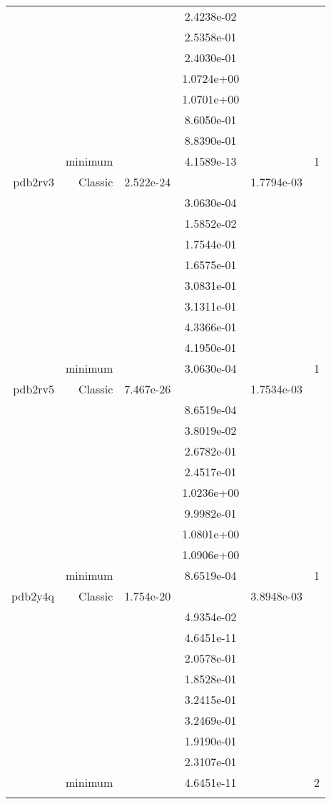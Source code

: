 \begin{xltabular}{\textwidth}{r|rS[table-format=1.3e+2]S[table-format=1.4e+2]S[table-format=1.4e+2]S[table-format=-1.5]}
&  &  & 2.4238e-02 & & \\
&  &  & 2.5358e-01 & & \\
&  &  & 2.4030e-01 & & \\
&  &  & 1.0724e+00 & & \\
&  &  & 1.0701e+00 & & \\
&  &  & 8.6050e-01 & & \\
&  &  & 8.8390e-01 & & \\
& minimum &  & 4.1589e-13 & & 1 \\  \addlinespace
pdb2rv3 & Classic & 2.522e-24 &  & 1.7794e-03 & \\
&  &  & 3.0630e-04 & & \\
&  &  & 1.5852e-02 & & \\
&  &  & 1.7544e-01 & & \\
&  &  & 1.6575e-01 & & \\
&  &  & 3.0831e-01 & & \\
&  &  & 3.1311e-01 & & \\
&  &  & 4.3366e-01 & & \\
&  &  & 4.1950e-01 & & \\
& minimum &  & 3.0630e-04 & & 1 \\  \addlinespace
pdb2rv5 & Classic & 7.467e-26 &  & 1.7534e-03 & \\
&  &  & 8.6519e-04 & & \\
&  &  & 3.8019e-02 & & \\
&  &  & 2.6782e-01 & & \\
&  &  & 2.4517e-01 & & \\
&  &  & 1.0236e+00 & & \\
&  &  & 9.9982e-01 & & \\
&  &  & 1.0801e+00 & & \\
&  &  & 1.0906e+00 & & \\
& minimum &  & 8.6519e-04 & & 1 \\  \addlinespace
pdb2y4q & Classic & 1.754e-20 &  & 3.8948e-03 & \\
&  &  & 4.9354e-02 & & \\
&  &  & 4.6451e-11 & & \\
&  &  & 2.0578e-01 & & \\
&  &  & 1.8528e-01 & & \\
&  &  & 3.2415e-01 & & \\
&  &  & 3.2469e-01 & & \\
&  &  & 1.9190e-01 & & \\
&  &  & 2.3107e-01 & & \\
& minimum &  & 4.6451e-11 & & 2 \\  \addlinespace
\end{xltabular}
